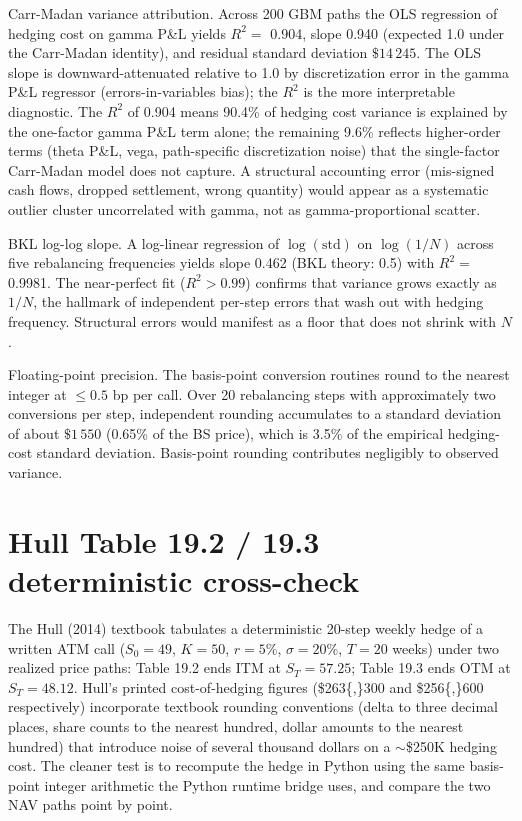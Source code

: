 \documentclass[
  11pt,
  letterpaper,
  DIV=12,
  numbers=noendperiod]{scrartcl}
\numberwithin{equation}{section}
\numberwithin{figure}{section}
\numberwithin{table}{section}
\let\quantproofsoldsection\section
\renewcommand{\section}{\clearpage\quantproofsoldsection}
\begin{document}
Carr-Madan variance attribution. Across 200 GBM paths the OLS regression
of hedging cost on gamma P\&L yields \(R^2 =\) 0.904, slope 0.940
(expected 1.0 under the Carr-Madan identity), and residual standard
deviation \(\$14\,245\). The OLS slope is downward-attenuated relative
to 1.0 by discretization error in the gamma P\&L regressor
(errors-in-variables bias); the \(R^2\) is the more interpretable
diagnostic. The \(R^2\) of 0.904 means 90.4\% of hedging cost variance
is explained by the one-factor gamma P\&L term alone; the remaining
9.6\% reflects higher-order terms (theta P\&L, vega, path-specific
discretization noise) that the single-factor Carr-Madan model does not
capture. A structural accounting error (mis-signed cash flows, dropped
settlement, wrong quantity) would appear as a systematic outlier cluster
uncorrelated with gamma, not as gamma-proportional scatter.

BKL log-log slope. A log-linear regression of \(\log(\text{std})\) on
\(\log(1/N)\) across five rebalancing frequencies yields slope 0.462
(BKL theory: 0.5) with \(R^2 =\) 0.9981. The near-perfect fit
(\(R^2 > 0.99\)) confirms that variance grows exactly as \(1/N\), the
hallmark of independent per-step errors that wash out with hedging
frequency. Structural errors would manifest as a floor that does not
shrink with \(N\).

Floating-point precision. The basis-point conversion routines round to
the nearest integer at \(\leq 0.5\) bp per call. Over 20 rebalancing
steps with approximately two conversions per step, independent rounding
accumulates to a standard deviation of about \(\$1\,550\) (0.65\% of the
BS price), which is 3.5\% of the empirical hedging-cost standard
deviation. Basis-point rounding contributes negligibly to observed
variance.

\section{Hull Table 19.2 / 19.3 deterministic
cross-check}\label{sec-appendix-hull}

The Hull (2014) textbook tabulates a deterministic 20-step weekly hedge
of a written ATM call (\(S_0 = 49\), \(K = 50\), \(r = 5\%\),
\(\sigma = 20\%\), \(T = 20\) weeks) under two realized price paths:
Table 19.2 ends ITM at \(S_T = 57.25\); Table 19.3 ends OTM at
\(S_T = 48.12\). Hull's printed cost-of-hedging figures (\$263\{,\}300
and \$256\{,\}600 respectively) incorporate textbook rounding
conventions (delta to three decimal places, share counts to the nearest
hundred, dollar amounts to the nearest hundred) that introduce noise of
several thousand dollars on a \(\sim\)\$250K hedging cost. The cleaner
test is to recompute the hedge in Python using the same basis-point
integer arithmetic the Python runtime bridge uses, and compare the two
NAV paths point by point.
\end{document}
